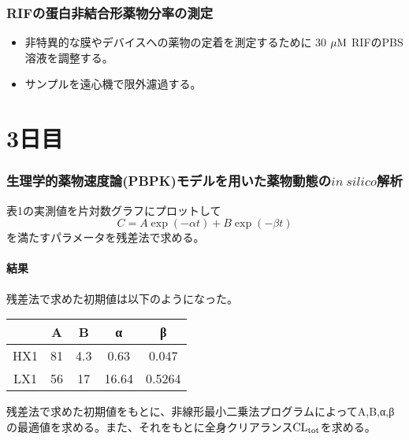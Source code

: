 \documentclass[a4paper,papersize,dvipdfmx]{jsarticle}
\begin{document}
\section*{RIFの蛋白非結合形薬物分率の測定}
\begin{itemize}
\item 非特異的な膜やデバイスへの薬物の定着を測定するために 30 $\rm \mu M$ RIFのPBS溶液を調整する。
\item サンプルを遠心機で限外濾過する。

\end{itemize}
\part*{3日目}
\section*{生理学的薬物速度論(PBPK)モデルを用いた薬物動態の$in \ silico$解析}


\begin{tcolorbox}[colback=white,colbacktitle=black!10!white,coltitle=black,title={(1)}]
表1の実測値を片対数グラフにプロットして
\[C=A \exp(-\alpha t) + B \exp(- \beta t)\]
を満たすパラメータを残差法で求める。
\end{tcolorbox}

\subsection*{結果}

残差法で求めた初期値は以下のようになった。
\begin{table}[H]
\begin{center}
\begin{tabular}{|c|c|c|c|c|}
\hline
& A   & B    & α    & β           \\ \hline
HX1 & 81 & 4.3 & 0.63  & 0.047  \\ \hline
LX1 & 56   & 17 & 16.64 & 0.5264 \\ \hline
\end{tabular}
\end{center}
\end{table}



\begin{tcolorbox}[colback=white,colbacktitle=black!10!white,coltitle=black,title={(2)}]
残差法で求めた初期値をもとに、非線形最小二乗法プログラムによってA,B,α,βの最適値を求める。また、それをもとに全身クリアランス$\rm CL_{tot}$を求める。
\end{tcolorbox}
\end{document}
